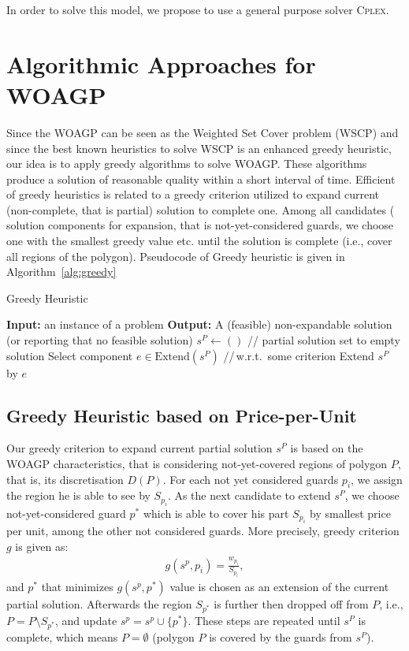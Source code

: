 \documentclass[runningheads,a4paper]{llncs}
\begin{document}
      In order to solve this model, we propose to use a general purpose solver \textsc{Cplex}.
     \section{Algorithmic Approaches for WOAGP}
          Since the WOAGP can be seen as the Weighted Set Cover problem (WSCP) and since the best known heuristics to solve WSCP is an enhanced greedy heuristic, our idea is to apply greedy algorithms to solve WOAGP. These algorithms produce a solution of reasonable quality within a short interval of time. Efficient of greedy heuristics is related to a greedy criterion utilized to expand current (non-complete, that is partial) solution to complete one. Among all candidates ( solution components for expansion, that is not-yet-considered guards, we choose one with the smallest greedy value etc. until the solution is complete (i.e., cover all regions of the polygon).
          Pseudocode of Greedy heuristic is given in Algorithm~\ref{alg:greedy}

          \begin{algorithm}[!t]
          	\caption{Greedy Heuristic}\label{alg:greedy}
          	\begin{algorithmic}[1]
          		\State \textbf{Input:} an instance of a problem
          		\State \textbf{Output:} A (feasible) non-expandable solution (or reporting that no feasible solution)
          		\State $s^{P} \gets ()$ \hspace{0.3cm}// partial solution set to empty solution
          		\State Select component $e \in  \text{Extend}(s^{P})$ \hspace{0.3cm}//\,w.r.t.\  some criterion
          		\State Extend $s^{P}$ by $e$
          		\EndWhile
          	\end{algorithmic}
          \end{algorithm}
      \subsection{Greedy Heuristic based on Price-per-Unit}
       Our greedy criterion to expand current partial solution $s^P$  is based on the WOAGP characteristics, that is considering not-yet-covered regions of polygon $P$, that is, its discretisation $D(P)$. For each not yet considered guards $p_i$, we assign the region he is able to see by $S_{p_i}$. As the next candidate to extend $s^P$, we choose not-yet-considered guard $p^*$ which is able to cover his part $S_{p_i}$ by smallest price per unit, among the other not considered guards. More precisely, greedy criterion $g$ is given as:
       \begin{align}
            g(s^p, p_i) = \frac{w_{p_i}}{S_{p_i}},
       \end{align}
       and $p^*$ that minimizes $g(s^p, p^*)$ value is chosen as an extension of the current partial solution.
       Afterwards the region $S_{p^*}$ is further then dropped off from $P$, i.e., $P=P \setminus S_{p^*}$, and update $s^p= s^p \cup \{p^*\}$.  These steps are repeated until $s^P$ is complete, which means $P = \emptyset$ (polygon $P$ is covered by the guards from $s^P$).
\end{document}
